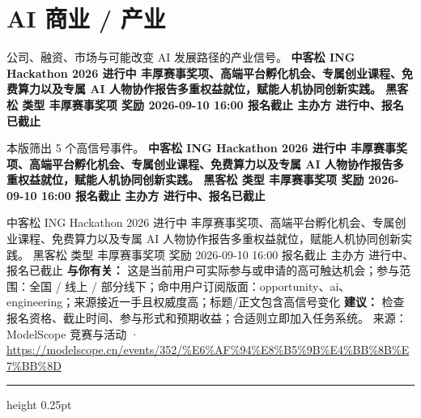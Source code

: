 \documentclass[10.5pt]{ctexart}
\begin{document}
\section*{AI 商业 / 产业}
{\color{ormuted} 公司、融资、市场与可能改变 AI 发展路径的产业信号。}
\vspace{2mm}
{\LARGE\bfseries 中客松 ING Hackathon 2026 进行中 丰厚赛事奖项、高端平台孵化机会、专属创业课程、免费算力以及专属 AI 人物协作报告多重权益就位，赋能人机协同创新实践。 黑客松 类型 丰厚赛事奖项 奖励 2026-09-10 16:00 报名截止 主办方 进行中、报名已截止}\par
\vspace{1mm}
{\color{ormuted} 本版筛出 5 个高信号事件。}
\vspace{3mm}
{\Large\bfseries 中客松 ING Hackathon 2026 进行中 丰厚赛事奖项、高端平台孵化机会、专属创业课程、免费算力以及专属 AI 人物协作报告多重权益就位，赋能人机协同创新实践。 黑客松 类型 丰厚赛事奖项 奖励 2026-09-10 16:00 报名截止 主办方 进行中、报名已截止}\par
中客松 ING Hackathon 2026 进行中 丰厚赛事奖项、高端平台孵化机会、专属创业课程、免费算力以及专属 AI 人物协作报告多重权益就位，赋能人机协同创新实践。 黑客松 类型 丰厚赛事奖项 奖励 2026-09-10 16:00 报名截止 主办方 进行中、报名已截止
\textbf{与你有关：} 这是当前用户可实际参与或申请的高可触达机会；参与范围：全国 / 线上 / 部分线下；命中用户订阅版面：opportunity、ai、engineering；来源接近一手且权威度高；标题/正文包含高信号变化
\textbf{建议：} 检查报名资格、截止时间、参与形式和预期收益；合适则立即加入任务系统。
{\footnotesize\color{ormuted} 来源：ModelScope 竞赛与活动 · \url{https://modelscope.cn/events/352/%E6%AF%94%E8%B5%9B%E4%BB%8B%E7%BB%8D}}
\vspace{4mm}
\hrule height 0.25pt
\vspace{3mm}
\end{document}
